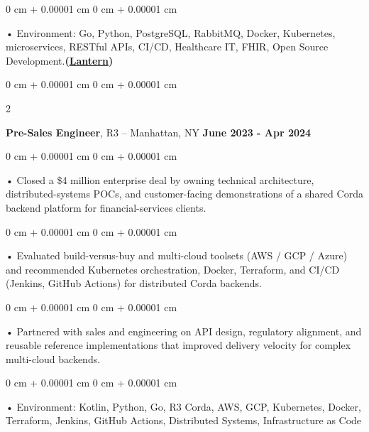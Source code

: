 \documentclass[10pt, letterpaper]{article}
\newenvironment{onecolentry}{
    \begin{adjustwidth}{
        0 cm + 0.00001 cm
    }{
        0 cm + 0.00001 cm
    }
}{
    \end{adjustwidth}
} %
\newenvironment{twocolentry}[2][]{
    \onecolentry
    \def\secondColumn{#2}
    \setcolumnwidth{\fill, 4.5 cm}
    \begin{paracol}{2}
}{
    \switchcolumn \raggedleft \secondColumn
    \end{paracol}
    \endonecolentry
} %
\begin{document}
        \begin{onecolentry}
             • Environment: Go, Python, PostgreSQL, RabbitMQ, Docker, Kubernetes, microservices, RESTful APIs, CI/CD, Healthcare IT, FHIR, Open Source Development.\textbf{(\href{https://lantern.healthit.gov/?tab=dashboard_tab}{Lantern})}
        \end{onecolentry}
        \vspace{0.1cm}

        \begin{twocolentry}{
            \textbf{June 2023 - Apr 2024}
        }
            \textbf{Pre-Sales Engineer}, R3 -- Manhattan, NY\end{twocolentry}


        \begin{onecolentry}
             • Closed a \$4 million enterprise deal by owning technical architecture, distributed-systems POCs, and customer-facing demonstrations of a shared Corda backend platform for financial-services clients.
        \end{onecolentry}
        \begin{onecolentry}
             • Evaluated build-versus-buy and multi-cloud toolsets (AWS / GCP / Azure) and recommended Kubernetes orchestration, Docker, Terraform, and CI/CD (Jenkins, GitHub Actions) for distributed Corda backends.
        \end{onecolentry}
        \begin{onecolentry}
             • Partnered with sales and engineering on API design, regulatory alignment, and reusable reference implementations that improved delivery velocity for complex multi-cloud backends.
        \end{onecolentry}
        \begin{onecolentry}
             • Environment: Kotlin, Python, Go, R3 Corda, AWS, GCP, Kubernetes, Docker, Terraform, Jenkins, GitHub Actions, Distributed Systems, Infrastructure as Code
        \end{onecolentry}
        \vspace{0.1cm}
\end{document}
